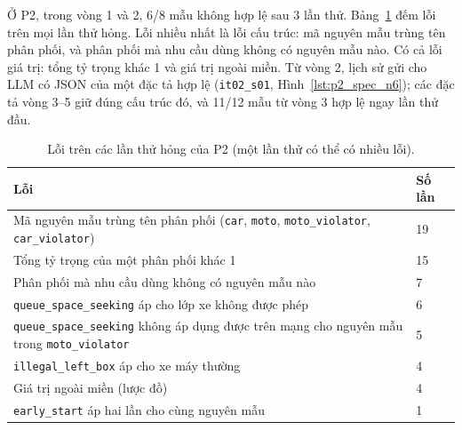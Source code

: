 \documentclass[../main.tex]{subfiles}
\begin{document}
Ở P2, trong vòng 1 và 2, 6/8 mẫu không hợp lệ sau 3 lần thử. Bảng~\ref{table:4.qwen_errors_n6} đếm lỗi trên mọi lần thử hỏng. Lỗi nhiều nhất là lỗi cấu trúc: mã nguyên mẫu trùng tên phân phối, và phân phối mà nhu cầu dùng không có nguyên mẫu nào. Có cả lỗi giá trị: tổng tỷ trọng khác 1 và giá trị ngoài miền. Từ vòng 2, lịch sử gửi cho LLM có JSON của một đặc tả hợp lệ (\texttt{it02\_s01}, Hình~\ref{lst:p2_spec_n6}); các đặc tả vòng 3--5 giữ đúng cấu trúc đó, và 11/12 mẫu từ vòng 3 hợp lệ ngay lần thử đầu.

\begin{table}[!htbp]
\centering
\small
\caption{Lỗi trên các lần thử hỏng của P2 (một lần thử có thể có nhiều lỗi).} \label{table:4.qwen_errors_n6}
\begin{tabular}{|>{\raggedright\arraybackslash}p{11.0cm}|p{1.8cm}|}
\hline
\textbf{Lỗi} & \textbf{Số lần} \\ \hline
Mã nguyên mẫu trùng tên phân phối (\texttt{car}, \texttt{moto}, \texttt{moto\_violator}, \texttt{car\_violator}) & 19 \\ \hline
Tổng tỷ trọng của một phân phối khác 1 & 15 \\ \hline
Phân phối mà nhu cầu dùng không có nguyên mẫu nào & 7 \\ \hline
\texttt{queue\_space\_seeking} áp cho lớp xe không được phép & 6 \\ \hline
\texttt{queue\_space\_seeking} không áp dụng được trên mạng cho nguyên mẫu trong \texttt{moto\_violator} & 5 \\ \hline
\texttt{illegal\_left\_box} áp cho xe máy thường & 4 \\ \hline
Giá trị ngoài miền (lược đồ) & 4 \\ \hline
\texttt{early\_start} áp hai lần cho cùng nguyên mẫu & 1 \\ \hline
\end{tabular}
\end{table}
\end{document}
